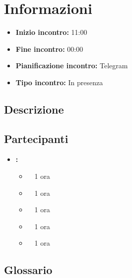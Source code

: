 \section{Informazioni}
\begin{itemize}
	\item \textbf{Inizio incontro:} 11:00
	\item \textbf{Fine incontro:} 00:00
	\item \textbf{Pianificazione incontro:} Telegram
	\item \textbf{Tipo incontro:} In presenza
\end{itemize}

\subsection{Descrizione}
\DocDescription

\subsection{Partecipanti}

\begin{itemize}
	\item \textbf{\GroupName:}
	\begin{itemize}
		\item \tommaso \ \rightarrow\ 1 ora
		\item \riccardo \ \rightarrow\ 1 ora
		\item \raul \ \rightarrow\ 1 ora
		\item \martina \ \rightarrow\ 1 ora
		\item \sebastiano \ \rightarrow\ 1 ora
	\end{itemize}
\end{itemize}

\subsection{Glossario}
\GlossarioIntroduzione

\clearpage